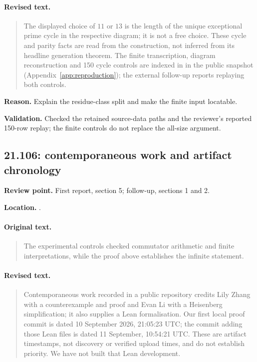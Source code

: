 \paragraph{Revised text.}
\begin{quote}\small
The displayed choice of \(11\) or \(13\) is the length of the unique
exceptional prime cycle in the respective diagram; it is not a free
choice. These cycle and parity facts are read from the construction,
not inferred from its headline generation theorem.
The finite transcription, diagram reconstruction and 150 cycle controls
are indexed in  in the public
snapshot (Appendix~\ref{app:reproduction}); the external follow-up
reports replaying both controls.
\end{quote}

\noindent\textbf{Reason.} Explain the residue-class split and make the finite input locatable.

\noindent\textbf{Validation.} Checked the retained source-data paths and the reviewer's reported 150-row replay; the finite controls do not replace the all-size argument.

\subsection{21.106: contemporaneous work and artifact chronology}
\noindent\textbf{Review point.} First report, section 5; follow-up, sections 1 and 2.\par
\noindent\textbf{Location.} .

\paragraph{Original text.}
\begin{quote}\small
The experimental controls checked commutator arithmetic and finite
interpretations, while the proof above establishes the infinite
statement.
\end{quote}

\paragraph{Revised text.}
\begin{quote}\small
Contemporaneous work recorded in a public repository credits Lily Zhang
with a counterexample and proof and Evan Li with a Heisenberg
simplification; it also supplies a Lean formalisation\cite{zhang-li-concise}.
Our first local proof commit is dated 10 September 2026, 21:05:23 UTC;
the commit adding those Lean files is dated 11 September, 10:54:21 UTC.
These are artifact timestamps, not discovery or verified upload times,
and do not establish priority. We have not built that Lean development.
\end{quote}

